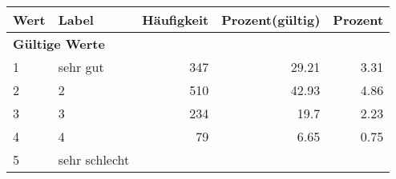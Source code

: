      \begin{longtable}{lXrrr}
     \toprule
     \textbf{Wert} & \textbf{Label} & \textbf{Häufigkeit} & \textbf{Prozent(gültig)} & \textbf{Prozent} \\
     \endhead
     \midrule
     \multicolumn{5}{l}{\textbf{Gültige Werte}}\\

     1 &
     \multicolumn{1}{X}{ sehr gut   } &


       \num{347} &
       \num[round-mode=places,round-precision=2]{29.21} &
         \num[round-mode=places,round-precision=2]{3.31} \\

     2 &
     \multicolumn{1}{X}{ 2   } &


       \num{510} &
       \num[round-mode=places,round-precision=2]{42.93} &
         \num[round-mode=places,round-precision=2]{4.86} \\

     3 &
     \multicolumn{1}{X}{ 3   } &


       \num{234} &
       \num[round-mode=places,round-precision=2]{19.7} &
         \num[round-mode=places,round-precision=2]{2.23} \\

     4 &
     \multicolumn{1}{X}{ 4   } &


       \num{79} &
       \num[round-mode=places,round-precision=2]{6.65} &
         \num[round-mode=places,round-precision=2]{0.75} \\

     5 &
     \multicolumn{1}{X}{ sehr schlecht   } &



\end{longtable}
